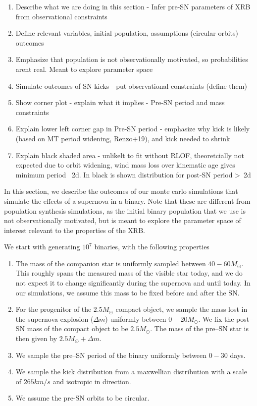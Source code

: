 \documentclass[linenumbers,trackchanges,twocolumn]{aastex701}
\begin{document}
\begin{enumerate}
    \item Describe what we are doing in this section - Infer pre-SN parameters of XRB from observational constraints
    \item Define relevant variables, initial population, assumptions (circular orbits) outcomes
    \item Emphasize that population is not observationally motivated, so probabilities arent real. Meant to explore parameter space
    \item Simulate outcomes of SN kicks - put observational constraints (define them)
    \item Show corner plot - explain what it implies - Pre-SN period and mass constraints
    \item Explain lower left corner gap in Pre-SN period - emphasize why kick is likely (based on MT period widening, Renzo+19), and kick needed to shrink
    \item Explain black shaded area - unlikelt to fit without RLOF, theoretcially not expected due to orbit widening, wind mass loss over kinematic age gives minimum period ~2d. In black is shown distribution for post-SN period >~2d
\end{enumerate}

In this section, we describe the outcomes of our monte carlo simulations that simulate the effects of a supernova in a binary. Note that these are different from population synthesis simulations, as the initial binary population that we use is not observationally motivated, but is meant to explore the parameter space of interest relevant to the properties of the XRB. 

We start with generating $10^7$ binaries, with the following properties
 
\begin{enumerate}
        \item The mass of the companion star is uniformly sampled between $40-60M_{\odot}$. This roughly spans the measured mass of the visible star today, and we do not expect it to change significantly during the supernova and until today. In our simulations, we assume this mass to be fixed before and after the SN.
        \item For the progenitor of the $2.5M_{\odot}$ compact object, we sample the mass lost in the supernova explosion ($\Delta m$) uniformly between $0-20M_{\odot}$. We fix the post--SN mass of the compact object to be $2.5M_{\odot}$. The mass of the pre--SN star is then given by $2.5M_{\odot}+\Delta m$.
        \item We sample the pre--SN period of the binary uniformly between $0-30$ days.
        \item We sample the kick distribution from a maxwellian distribution with a scale of $265 km/s$ and isotropic in direction.
        \item We assume the pre-SN orbits to be circular.
\end{enumerate}
\end{document}
